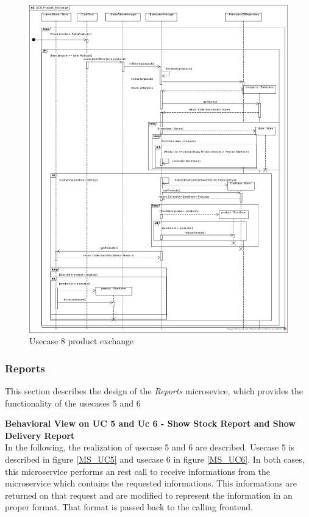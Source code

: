 			\begin{figure}[!h]
				\centering
				\includegraphics[width = 1\textwidth]{img/UC8_Product_Exchange.jpg}
				\caption{Usecase 8 product exchange}
				\label{MS_UC8}
			\end{figure}
		\FloatBarrier	
		
		\subsubsection{Reports}
		This section describes the design of the \textit{Reports} microsevice, which provides the functionality of the usecases 5 and 6
		
		\textbf{Behavioral View on UC 5 and Uc 6 - Show Stock Report and Show Delivery Report} \\
		In the following, the realization of usecase 5 and 6 are described. Usecase 5 is described in figure \ref{MS_UC5} and usecase 6 in figure \ref{MS_UC6}. 
		In both cases, this microservice performs an rest call to receive informations from the microservice which contains the requested informations. This informations are returned on that request and are modified to represent the information in an proper format. That format is passed back to the calling frontend.
			
